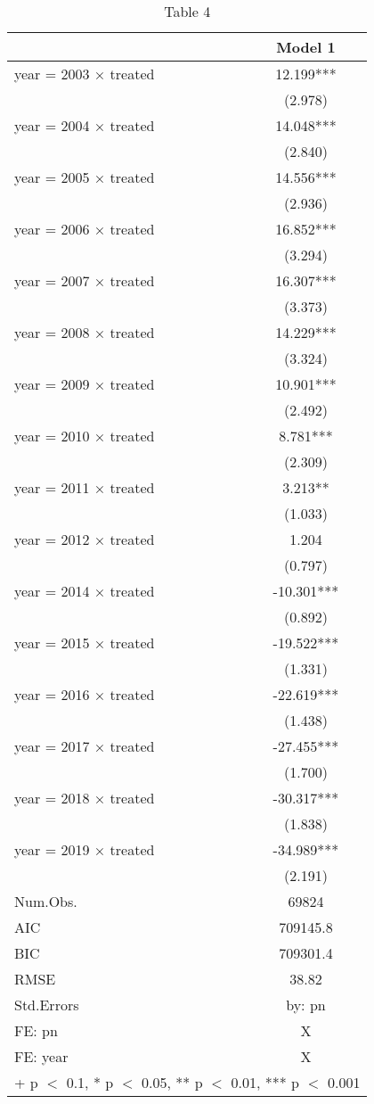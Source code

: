 \begin{table}

\caption{Table 4}
\centering
\begin{tabular}[t]{lc}
\toprule
  & Model 1\\
\midrule
year = 2003 × treated & 12.199***\\
 & (2.978)\\
year = 2004 × treated & 14.048***\\
 & (2.840)\\
year = 2005 × treated & 14.556***\\
 & (2.936)\\
year = 2006 × treated & 16.852***\\
 & (3.294)\\
year = 2007 × treated & 16.307***\\
 & (3.373)\\
year = 2008 × treated & 14.229***\\
 & (3.324)\\
year = 2009 × treated & 10.901***\\
 & (2.492)\\
year = 2010 × treated & 8.781***\\
 & (2.309)\\
year = 2011 × treated & 3.213**\\
 & (1.033)\\
year = 2012 × treated & 1.204\\
 & (0.797)\\
year = 2014 × treated & -10.301***\\
 & (0.892)\\
year = 2015 × treated & -19.522***\\
 & (1.331)\\
year = 2016 × treated & -22.619***\\
 & (1.438)\\
year = 2017 × treated & -27.455***\\
 & (1.700)\\
year = 2018 × treated & -30.317***\\
 & (1.838)\\
year = 2019 × treated & -34.989***\\
 & (2.191)\\
\midrule
Num.Obs. & 69824\\
AIC & 709145.8\\
BIC & 709301.4\\
RMSE & 38.82\\
Std.Errors & by: pn\\
FE: pn & X\\
FE: year & X\\
\bottomrule
\multicolumn{2}{l}{\rule{0pt}{1em}+ p $<$ 0.1, * p $<$ 0.05, ** p $<$ 0.01, *** p $<$ 0.001}\\
\end{tabular}
\end{table}
